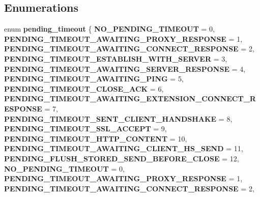 \subsection*{Enumerations}
\begin{DoxyCompactItemize}
\item 
\mbox{\label{group__timeout_ga2c0aa4b9c3c55bae7b35cbfac3246c87}} 
enum {\bfseries pending\+\_\+timeout} \{ \newline
{\bfseries N\+O\+\_\+\+P\+E\+N\+D\+I\+N\+G\+\_\+\+T\+I\+M\+E\+O\+UT} = 0, 
{\bfseries P\+E\+N\+D\+I\+N\+G\+\_\+\+T\+I\+M\+E\+O\+U\+T\+\_\+\+A\+W\+A\+I\+T\+I\+N\+G\+\_\+\+P\+R\+O\+X\+Y\+\_\+\+R\+E\+S\+P\+O\+N\+SE} = 1, 
{\bfseries P\+E\+N\+D\+I\+N\+G\+\_\+\+T\+I\+M\+E\+O\+U\+T\+\_\+\+A\+W\+A\+I\+T\+I\+N\+G\+\_\+\+C\+O\+N\+N\+E\+C\+T\+\_\+\+R\+E\+S\+P\+O\+N\+SE} = 2, 
{\bfseries P\+E\+N\+D\+I\+N\+G\+\_\+\+T\+I\+M\+E\+O\+U\+T\+\_\+\+E\+S\+T\+A\+B\+L\+I\+S\+H\+\_\+\+W\+I\+T\+H\+\_\+\+S\+E\+R\+V\+ER} = 3, 
\newline
{\bfseries P\+E\+N\+D\+I\+N\+G\+\_\+\+T\+I\+M\+E\+O\+U\+T\+\_\+\+A\+W\+A\+I\+T\+I\+N\+G\+\_\+\+S\+E\+R\+V\+E\+R\+\_\+\+R\+E\+S\+P\+O\+N\+SE} = 4, 
{\bfseries P\+E\+N\+D\+I\+N\+G\+\_\+\+T\+I\+M\+E\+O\+U\+T\+\_\+\+A\+W\+A\+I\+T\+I\+N\+G\+\_\+\+P\+I\+NG} = 5, 
{\bfseries P\+E\+N\+D\+I\+N\+G\+\_\+\+T\+I\+M\+E\+O\+U\+T\+\_\+\+C\+L\+O\+S\+E\+\_\+\+A\+CK} = 6, 
{\bfseries P\+E\+N\+D\+I\+N\+G\+\_\+\+T\+I\+M\+E\+O\+U\+T\+\_\+\+A\+W\+A\+I\+T\+I\+N\+G\+\_\+\+E\+X\+T\+E\+N\+S\+I\+O\+N\+\_\+\+C\+O\+N\+N\+E\+C\+T\+\_\+\+R\+E\+S\+P\+O\+N\+SE} = 7, 
\newline
{\bfseries P\+E\+N\+D\+I\+N\+G\+\_\+\+T\+I\+M\+E\+O\+U\+T\+\_\+\+S\+E\+N\+T\+\_\+\+C\+L\+I\+E\+N\+T\+\_\+\+H\+A\+N\+D\+S\+H\+A\+KE} = 8, 
{\bfseries P\+E\+N\+D\+I\+N\+G\+\_\+\+T\+I\+M\+E\+O\+U\+T\+\_\+\+S\+S\+L\+\_\+\+A\+C\+C\+E\+PT} = 9, 
{\bfseries P\+E\+N\+D\+I\+N\+G\+\_\+\+T\+I\+M\+E\+O\+U\+T\+\_\+\+H\+T\+T\+P\+\_\+\+C\+O\+N\+T\+E\+NT} = 10, 
{\bfseries P\+E\+N\+D\+I\+N\+G\+\_\+\+T\+I\+M\+E\+O\+U\+T\+\_\+\+A\+W\+A\+I\+T\+I\+N\+G\+\_\+\+C\+L\+I\+E\+N\+T\+\_\+\+H\+S\+\_\+\+S\+E\+ND} = 11, 
\newline
{\bfseries P\+E\+N\+D\+I\+N\+G\+\_\+\+F\+L\+U\+S\+H\+\_\+\+S\+T\+O\+R\+E\+D\+\_\+\+S\+E\+N\+D\+\_\+\+B\+E\+F\+O\+R\+E\+\_\+\+C\+L\+O\+SE} = 12, 
{\bfseries N\+O\+\_\+\+P\+E\+N\+D\+I\+N\+G\+\_\+\+T\+I\+M\+E\+O\+UT} = 0, 
{\bfseries P\+E\+N\+D\+I\+N\+G\+\_\+\+T\+I\+M\+E\+O\+U\+T\+\_\+\+A\+W\+A\+I\+T\+I\+N\+G\+\_\+\+P\+R\+O\+X\+Y\+\_\+\+R\+E\+S\+P\+O\+N\+SE} = 1, 
{\bfseries P\+E\+N\+D\+I\+N\+G\+\_\+\+T\+I\+M\+E\+O\+U\+T\+\_\+\+A\+W\+A\+I\+T\+I\+N\+G\+\_\+\+C\+O\+N\+N\+E\+C\+T\+\_\+\+R\+E\+S\+P\+O\+N\+SE} = 2, 

\end{DoxyCompactItemize}
